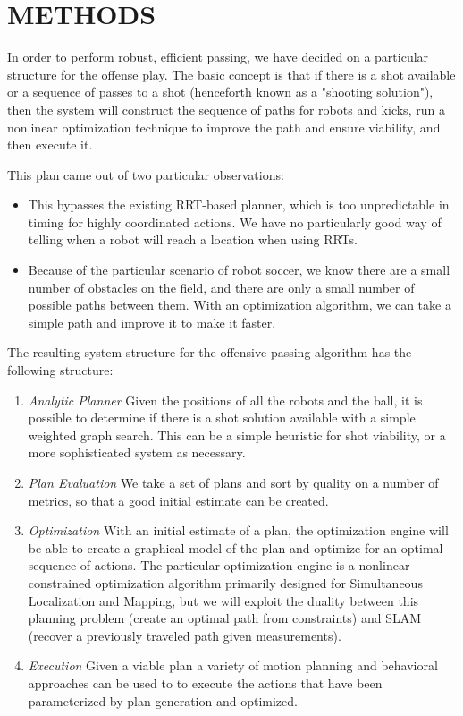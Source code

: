 \documentclass[a4paper, 10pt, conference]{ieeeconf}      %
\begin{document}
\section{METHODS}
In order to perform robust, efficient passing, we have decided on a particular structure for the offense play. The basic concept is that if there is a shot available or a sequence of passes to a shot (henceforth known as a "shooting solution"), then the system will construct the sequence of paths for robots and kicks, run a nonlinear optimization technique to improve the path and ensure viability, and then execute it.

This plan came out of two particular observations:

\begin{itemize}
 \item This bypasses the existing RRT-based planner, which is too unpredictable in timing for highly coordinated actions. We have no particularly good way of telling when a robot will reach a location when using RRTs.
 \item Because of the particular scenario of robot soccer, we know there are a small number of obstacles on the field, and there are only a small number of possible paths between them. With an optimization algorithm, we can take a simple path and improve it to make it faster.
\end{itemize}

The resulting system structure for the offensive passing algorithm has the following structure:
\begin{enumerate}
 \item \textit{Analytic Planner} Given the positions of all the robots and the ball, it is possible to determine if there is a shot solution available with a simple weighted graph search. This can be a simple heuristic for shot viability, or a more sophisticated system as necessary.
 \item \textit{Plan Evaluation} We take a set of plans and sort by quality on a number of metrics, so that a good initial estimate can be created.
 \item \textit{Optimization} With an initial estimate of a plan, the optimization engine will be able to create a graphical model of the plan and optimize for an optimal sequence of actions. The particular optimization engine is a nonlinear constrained optimization algorithm primarily designed for Simultaneous Localization and Mapping, but we will exploit the duality between this planning problem (create an optimal path from constraints) and SLAM (recover a previously traveled path given measurements).
 \item \textit{Execution} Given a viable plan a variety of motion planning and behavioral approaches can be used to to execute the actions that have been parameterized by plan generation and optimized.  
\end{enumerate}
\end{document}

